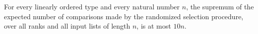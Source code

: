 \begin{theorem}
\label{Randomized.maxExpectedComparisons_le}
\leanok
{}
For every linearly ordered type and every natural number $n$, the supremum of the
expected number of comparisons made by the randomized selection procedure, over all
ranks and all input lists of length $n$, is at most $10n$.
\end{theorem}
